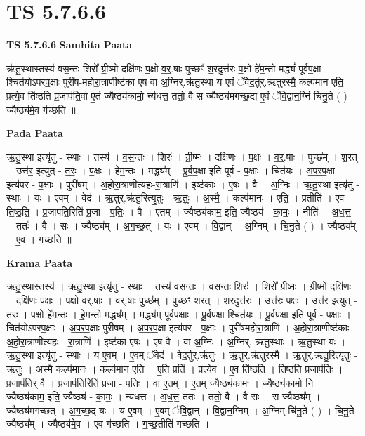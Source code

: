 \documentclass[17pt]{extarticle}
\begin{document}
\section{ TS 5.7.6.6 }

\textbf{TS 5.7.6.6 } \newline
\textbf{Samhita Paata} \newline

ऋ॑तु॒स्थास्तस्य॑ वस॒न्तः शिरो᳚ ग्री॒ष्मो दक्षि॑णः प॒क्षो व॒र्॒.षाः पुच्छꣳ॑ श॒रदुत्त॑रः प॒क्षो हे॑म॒न्तो मद्ध्यं॑ पूर्वप॒क्षा-श्चित॑योऽपरप॒क्षाः पुरी॑ष-महोरा॒त्राणीष्ट॑का ए॒ष वा अ॒ग्निर्.ऋ॑तु॒स्था य ए॒वं ॅवेद॒र्तुर्.ऋ॑तुरस्मै॒ कल्प॑मान एति॒ प्रत्ये॒व ति॑ष्ठति प्र॒जाप॑ति॒र्वा ए॒तं ज्यैष्ठ्य॑कामो॒ न्य॑धत्त॒ ततो॒ वै स ज्यैष्ठ्य॑मगच्छ॒द्य ए॒वं ॅवि॒द्वान॒ग्निं चि॑नु॒ते ( ) ज्यैष्ठ्य॑मे॒व ग॑च्छति ॥ \newline

\textbf{Pada Paata} \newline

ऋ॒तु॒स्था इत्यृ॑तु - स्थाः । तस्य॑ । व॒स॒न्तः । शिरः॑ । ग्री॒ष्मः । दक्षि॑णः । प॒क्षः । व॒र्॒.षाः । पुच्छ᳚म् । श॒रत् । उत्त॑र॒ इत्युत् - त॒रः॒ । प॒क्षः । हे॒म॒न्तः । मद्ध्य᳚म् । पू॒र्व॒प॒क्षा इति॑ पूर्व - प॒क्षाः । चित॑यः । अ॒प॒र॒प॒क्षा इत्य॑पर - प॒क्षाः । पुरी॑षम् । अ॒हो॒रा॒त्राणीत्य॑हः-रा॒त्राणि॑ । इष्ट॑काः । ए॒षः । वै । अ॒ग्निः । ऋ॒तु॒स्था इत्यृ॑तु - स्थाः । यः । ए॒वम् । वेद॑ । ऋ॒तुर्.ऋ॑तु॒रित्यृ॒तुः - ऋ॒तुः॒ । अ॒स्मै॒ । कल्प॑मानः । ए॒ति॒ । प्रतीति॑ । ए॒व । ति॒ष्ठ॒ति॒ । प्र॒जाप॑ति॒रिति॑ प्र॒जा - प॒तिः॒ । वै । ए॒तम् । ज्यैष्ठ्य॑काम॒ इति॒ ज्यैष्ठ्य॑ - का॒मः॒ । नीति॑ । अ॒ध॒त्त॒ । ततः॑ । वै । सः । ज्यैष्ठ्य᳚म् । अ॒ग॒च्छ॒त् । यः । ए॒वम् । वि॒द्वान् । अ॒ग्निम् । चि॒नु॒ते ( ) । ज्यैष्ठ्य᳚म् । ए॒व । ग॒च्छ॒ति॒ ॥  \newline


\textbf{Krama Paata} \newline

ऋ॒तु॒स्थास्तस्य॑ । ऋ॒तु॒स्था इत्यृ॑तु - स्थाः । तस्य॑ वस॒न्तः । व॒स॒न्तः शिरः॑ । शिरो᳚ ग्री॒ष्मः । ग्री॒ष्मो दक्षि॑णः । दक्षि॑णः प॒क्षः । प॒क्षो व॒र्॒.षाः । व॒र्॒.षाः पुच्छ᳚म् । पुच्छꣳ॑ श॒रत् । श॒रदुत्त॑रः । उत्त॑रः प॒क्षः । उत्त॑र॒ इत्युत् - त॒रः॒ । प॒क्षो हे॑म॒न्तः । हे॒म॒न्तो मद्ध्य᳚म् । मद्ध्य॑म् पूर्वप॒क्षाः । पू॒र्व॒प॒क्षा श्चित॑यः । पू॒र्व॒प॒क्षा इति॑ पूर्व - प॒क्षाः । चित॑योऽपरप॒क्षाः । अ॒प॒र॒प॒क्षाः पुरी॑षम् । अ॒प॒र॒प॒क्षा इत्य॑पर - प॒क्षाः । पुरी॑षमहोरा॒त्राणि॑ । अ॒हो॒रा॒त्राणीष्ट॑काः । अ॒हो॒रा॒त्राणीत्य॑हः - रा॒त्राणि॑ । इष्ट॑का ए॒षः । ए॒ष वै । वा अ॒ग्निः । अ॒ग्निर्. ऋ॑तु॒स्थाः । ऋ॒तु॒स्था यः । ऋ॒तु॒स्था इत्यृ॑तु - स्थाः । य ए॒वम् । ए॒वम् ॅवेद॑ । वेद॒र्तुर्.ऋ॑तुः । ऋ॒तुर्.ऋ॑तुरस्मै । ऋ॒तुर्.ऋ॑तु॒रित्यृ॒तुः - ऋ॒तुः॒ । अ॒स्मै॒ कल्प॑मानः । कल्प॑मान एति । ए॒ति॒ प्रति॑ । प्रत्ये॒व । ए॒व ति॑ष्ठति । ति॒ष्ठ॒ति॒ प्र॒जाप॑तिः । प्र॒जाप॑ति॒र् वै । प्र॒जाप॑ति॒रिति॑ प्र॒जा - प॒तिः॒ । वा ए॒तम् । ए॒तम् ज्यैष्ठ्य॑कामः । ज्यैष्ठ्य॑कामो॒ नि । ज्यैष्ठ्य॑काम॒ इति॒ ज्यैष्ठ्य॑ - का॒मः॒ । न्य॑धत्त । अ॒ध॒त्त॒ ततः॑ । ततो॒ वै । वै सः । स ज्यैष्ठ्य᳚म् । ज्यैष्ठ्य॑मगच्छत् । अ॒ग॒च्छ॒द् यः । य ए॒वम् । ए॒वम् ॅवि॒द्वान् । वि॒द्वान॒ग्निम् । अ॒ग्निम् चि॑नु॒ते ( ) । चि॒नु॒ते ज्यैष्ठ्य᳚म् । ज्यैष्ठ्य॑मे॒व । ए॒व ग॑च्छति । ग॒च्छ॒तीति॑ गच्छति । \newline
\end{document}
